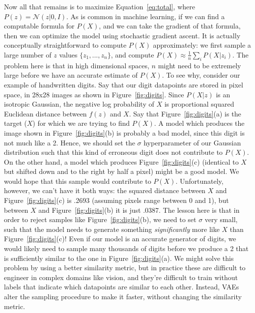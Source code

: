 \documentclass[a4paper, 11pt]{article} %
\begin{document}
Now all that remains is to maximize Equation~\ref{eq:total}, where $P(z)=\mathcal{N}(z|0,I)$.  
As is common in machine learning, if we can find a computable formula for $P(X)$, and we can take the gradient of that formula, then we can optimize the model using stochastic gradient ascent. %
It is actually conceptually straightforward to compute $P(X)$ approximately: we first sample a large number of $z$ values $\{ z_{1} , ..., z_{n}\}$, and compute $P(X)\approx\frac{1}{n}\sum_i P(X|z_i)$.  %
The problem here is that in high dimensional spaces, $n$ might need to be extremely large before we have an accurate estimate of $P(X)$.  
To see why, consider our example of handwritten digits.  
Say that our digit datapoints are stored in pixel space, in 28x28 images as shown in Figure~\ref{fig:digits}.
Since $P(X|z)$ is an isotropic Gaussian, the negative log probability of $X$ is proportional squared Euclidean distance between $f(z)$ and $X$.
Say that Figure~\ref{fig:digits}(a) is the target ($X$) for which we are trying to find $P(X)$.
A model which produces the image shown in Figure~\ref{fig:digits}(b) is probably a bad model, since this digit is not much like a 2.
Hence, we should set the $\sigma$ hyperparameter of our Gaussian distribution such that this kind of erroneous digit does not contribute to $P(X)$.
On the other hand, a model which produces Figure~\ref{fig:digits}(c) (identical to $X$ but shifted down and to the right by half a pixel) might be a good model.
We would hope that this sample would contribute to  $P(X)$.
Unfortunately, however, we can't have it both ways: the squared distance between $X$ and Figure~\ref{fig:digits}(c) is .2693 (assuming pixels range between 0 and 1), but between $X$ and Figure~\ref{fig:digits}(b) it is just .0387.  
The lesson here is that in order to reject samples like Figure~\ref{fig:digits}(b), we need to set $\sigma$ very small, such that the model needs to generate something \textit{significantly} more like $X$ than Figure~\ref{fig:digits}(c)!
Even if our model is an accurate generator of digits, we would likely need to sample many thousands of digits before we produce a 2 that is sufficiently similar to the one in Figure~\ref{fig:digits}(a).  
We might solve this problem by using a better similarity metric, but in practice these are difficult to engineer in complex domains like vision, and they're difficult to train without labels that indicate which datapoints are similar to each other.
Instead, VAEs alter the sampling procedure to make it faster, without changing the similarity metric.
\end{document}
